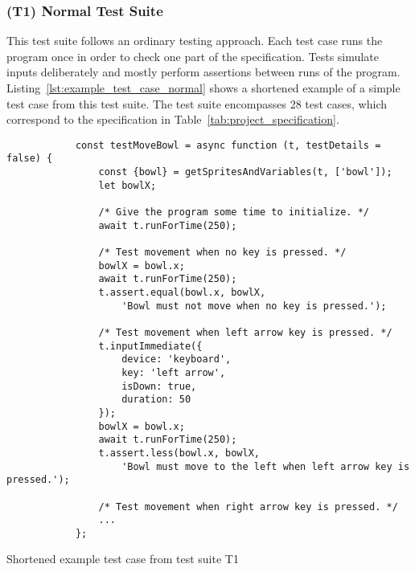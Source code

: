 \subsubsection{(T1) Normal Test Suite}

This test suite follows an ordinary testing approach.
Each test case runs the program once in order to check one part of the specification.
Tests simulate inputs deliberately and mostly perform assertions between runs of the program.
Listing~\ref{lst:example_test_case_normal} shows a shortened example of a simple test case from this test suite.
The test suite encompasses 28 test cases, which correspond to the specification in Table~\ref{tab:project_specification}.
\parspace

\begin{listing}[htpb]
    \centering
    \begin{minipage}{.70\textwidth}
        \begin{verbatim}
            const testMoveBowl = async function (t, testDetails = false) {
                const {bowl} = getSpritesAndVariables(t, ['bowl']);
                let bowlX;

                /* Give the program some time to initialize. */
                await t.runForTime(250);

                /* Test movement when no key is pressed. */
                bowlX = bowl.x;
                await t.runForTime(250);
                t.assert.equal(bowl.x, bowlX,
                    'Bowl must not move when no key is pressed.');

                /* Test movement when left arrow key is pressed. */
                t.inputImmediate({
                    device: 'keyboard',
                    key: 'left arrow',
                    isDown: true,
                    duration: 50
                });
                bowlX = bowl.x;
                await t.runForTime(250);
                t.assert.less(bowl.x, bowlX,
                    'Bowl must move to the left when left arrow key is pressed.');

                /* Test movement when right arrow key is pressed. */
                ...
            };
        \end{verbatim}
    \end{minipage}

    \caption{Shortened example test case from test suite T1}
    \label{lst:example_test_case_normal}
\end{listing}

